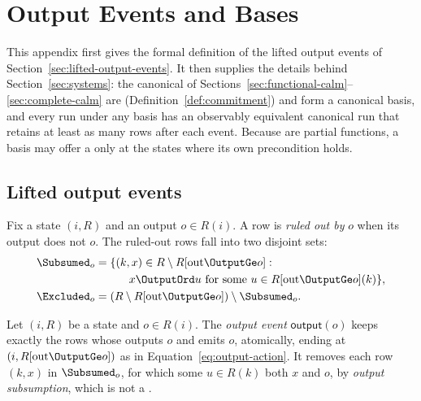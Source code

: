 \section{Output Events and \Commitment Bases}
\label{app:bases}

This appendix first gives the formal definition of the lifted output events of
Section~\ref{sec:lifted-output-events}.  It then supplies the details behind
Section~\ref{sec:systems}: the canonical \commitments of
Sections~\ref{sec:functional-calm}--\ref{sec:complete-calm}
are \commitments (Definition~\ref{def:commitment}) and form a canonical basis,
and every run under any basis
has an observably equivalent canonical run that retains at least as many rows
after each event.  Because \commitments are partial functions, a basis may
offer a \commitment only at the states where its own precondition holds.

\subsection{Lifted output events}
\label{app:lifted-output-events}

Fix a state $(i,R)$ and an output $o\in R(i)$.  A row is \emph{ruled out by}
$o$ when its output does not \outrelbase $o$.  The ruled-out rows fall into two
disjoint sets:
\begin{align}
  \Subsumed_o&=\{(k,x)\in R\setminus R[\mathrm{out}\OutputGe o]:\notag\\
    &\qquad\quad x\OutputOrd u\text{ for some }u\in R[\mathrm{out}\OutputGe o](k)\},
      \label{eq:output-subsumptions}\\
  \Excluded_o&=(R\setminus R[\mathrm{out}\OutputGe o])\setminus\Subsumed_o.
      \label{eq:commitment-removals}
\end{align}

\begin{definition}
\label{def:lifted-output-event}
Let $(i,R)$ be a state and $o\in R(i)$.  The \emph{output event}
$\mathsf{output}(o)$ keeps exactly the rows whose outputs \outrelbase $o$ and
emits $o$, atomically, ending at $(i,R[\mathrm{out}\OutputGe o])$ as in
Equation~\ref{eq:output-action}.  It removes each row $(k,x)$ in
$\Subsumed_o$, for which some $u\in R(k)$ \outrel both $x$ and $o$, by
\emph{output subsumption}, which is not a \commitment.
\end{definition}

